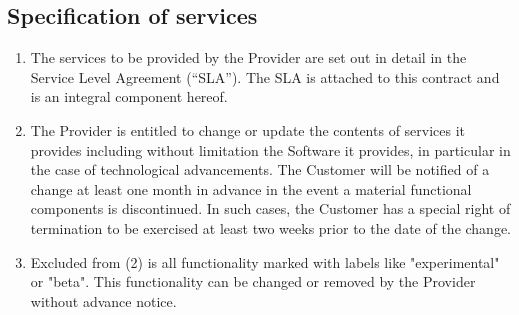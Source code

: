 \documentclass{terms}
\begin{document}
\subsection{Specification of services}
\begin{enumerate}
\item The services to be provided by the Provider are set out in detail in the Service Level Agreement (“SLA”). The SLA is attached to this contract and is an integral component hereof.
\item The Provider is entitled to change or update the contents of services it provides including without limitation the Software it provides, in particular in the case of technological advancements. The Customer will be notified of a change at least one month in advance in the event a material functional components is discontinued. In such cases, the Customer has a special right of termination to be exercised at least two weeks prior to the date of the change.
\item Excluded from (2) is all functionality marked with labels like "experimental" or "beta". This functionality can be changed or removed by the Provider without advance notice.
\end{enumerate}
\end{document}
